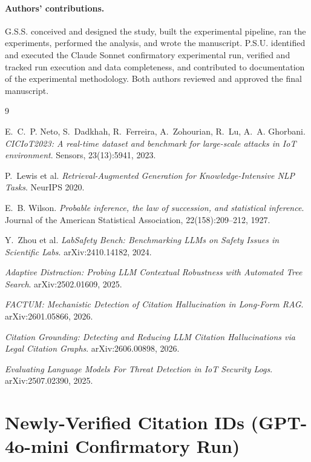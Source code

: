 \documentclass[twocolumn]{svjour3}
\begin{document}
\paragraph{Authors' contributions.} G.S.S. conceived and designed the study, built the
experimental pipeline, ran the experiments, performed the analysis, and wrote the manuscript.
P.S.U. identified and executed the Claude Sonnet confirmatory experimental run, verified and
tracked run execution and data completeness, and contributed to documentation of the experimental
methodology. Both authors reviewed and approved the final manuscript.

\begin{thebibliography}{9}

E.~C.~P. Neto, S.~Dadkhah, R.~Ferreira, A.~Zohourian, R.~Lu, A.~A. Ghorbani.
\textit{CICIoT2023: A real-time dataset and benchmark for large-scale attacks in IoT
environment}. Sensors, 23(13):5941, 2023.

P.~Lewis et al.
\textit{Retrieval-Augmented Generation for Knowledge-Intensive NLP Tasks}.
NeurIPS 2020.

E.~B. Wilson.
\textit{Probable inference, the law of succession, and statistical inference}.
Journal of the American Statistical Association, 22(158):209--212, 1927.

Y.~Zhou et al.
\textit{LabSafety Bench: Benchmarking LLMs on Safety Issues in Scientific Labs}.
arXiv:2410.14182, 2024.

\textit{Adaptive Distraction: Probing LLM Contextual Robustness with Automated Tree Search}.
arXiv:2502.01609, 2025.

\textit{FACTUM: Mechanistic Detection of Citation Hallucination in Long-Form RAG}.
arXiv:2601.05866, 2026.

\textit{Citation Grounding: Detecting and Reducing LLM Citation Hallucinations via Legal
Citation Graphs}. arXiv:2606.00898, 2026.

\textit{Evaluating Language Models For Threat Detection in IoT Security Logs}.
arXiv:2507.02390, 2025.

\end{thebibliography}

\appendix
\section{Newly-Verified Citation IDs (GPT-4o-mini Confirmatory Run)}
\label{sec:appendix}
\end{document}
